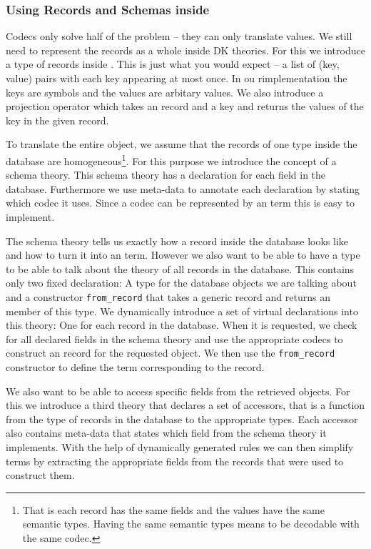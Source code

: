 \subsubsection{Using Records and Schemas inside \MMT}

Codecs only solve half of the problem -- they can only translate values. We still need to
represent the records as a whole inside DK theories. For this we introduce a type of
records inside \MMT. This is just what you would expect -- a list of (key, value) pairs
with each key appearing at most once. In ou rimplementation the keys are \MMT symbols and
the values are arbitary \MMT values. We also introduce a projection operator which takes
an \MMT record and a key and returns the values of the key in the given record.

To translate the entire object, we assume that the records of one type inside the database
are homogeneous\footnote{That is each record has the same fields and the values have the
  same semantic types. Having the same semantic types means to be decodable with the same
  codec. }. For this purpose we introduce the concept of a schema theory. This schema
theory has a declaration for each field in the database. Furthermore we use meta-data to
annotate each declaration by stating which codec it uses. Since a codec can be represented
by an \MMT term this is easy to implement.

The schema theory tells us exactly how a record inside the database looks like and how to
turn it into an \MMT term. However we also want to be able to have a type to be able to
talk about the theory of all records in the database. This contains only two fixed
declaration: A type for the database objects we are talking about and a constructor
\texttt{from\_record} that takes a generic
record and returns an member of this type. We dynamically introduce a set of virtual
declarations into this theory: One for each record in the database. When it is requested,
we check for all declared fields in the schema theory and use the appropriate codecs to
construct an \MMT record for the requested object. We then use the \texttt{from\_record}
constructor to define the \MMT term corresponding to the record.

We also want to be able to access specific fields from the retrieved objects. For this we
introduce a third theory that declares a set of accessors, that is a function from the
type of records in the database to the appropriate types. Each accessor also contains
meta-data that states which field from the schema theory it implements. With the help of
dynamically generated rules we can then simplify terms by extracting the appropriate
fields from the records that were used to construct them.

